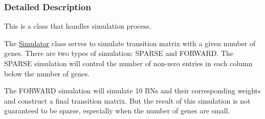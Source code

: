 \subsubsection{Detailed Description}
This is a class that handles simulation process. 

The \hyperlink{class_simulator}{Simulator} class serves to simulate transition matrix with a given number of genes. There are two types of simulation\+: S\+P\+A\+R\+S\+E and F\+O\+R\+W\+A\+R\+D. The S\+P\+A\+R\+S\+E simulation will control the number of non-\/zero entries in each column below the number of genes.

The F\+O\+R\+W\+A\+R\+D simulation will simulate 10 B\+Ns and their corresponding weights and construct a final transition matrix. But the result of this simulation is not guaranteed to be sparse, especially when the number of genes are small. 

